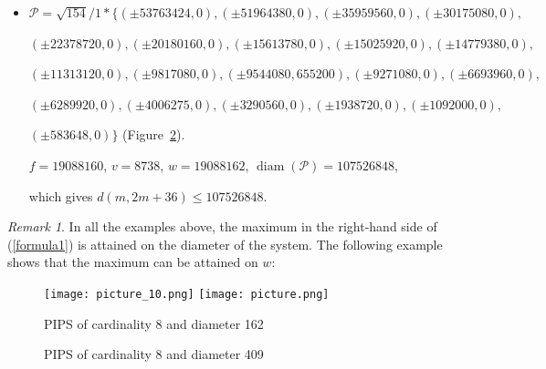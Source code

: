 \documentclass[12pt]{article}
\theoremstyle{theorem}
\theoremstyle{dfn}
\theoremstyle{remark}
\newtheorem{remark}{Remark}
\begin{document}
\begin{itemize}
$
(\pm 4006275, 0),
(\pm 3290560, 0),
(\pm 1938720, 0),
(\pm 1092000, 0),
$

$
(\pm 583648, 0),
(-53763424 , 0)\}
$
(Figure~\ref{picture_39.png}).

$f = 19088160$, $v = 8738$, $w = 19088162$, $\operatorname{diam(\mathcal{P})} = 105727804$,

which gives $d(m, 2m + 35) \leq 105727804$.


\begin{figure}[h!]
\parbox{1\linewidth}{\caption{PIPS of cardinality 39 and diameter 105727804}
\label{picture_39.png}}
\end{figure}


\begin{figure}[h!]
	\begin{center}
	\texttt{[image: picture\_40.png]}
	\parbox{1\linewidth}{\caption{PIPS of cardinality 40 and diameter 107526848}
	\label{picture_40.png}}
	\end{center}
\end{figure}


\item
$\mathcal{P}=\sqrt{154}/{1} * \{ (\pm 53763424, 0),
(\pm 51964380 , 0),
(\pm 35959560 , 0),
(\pm 30175080 , 0),
$

$
(\pm 22378720 , 0),
(\pm 20180160 , 0),
(\pm 15613780 , 0),
(\pm 15025920 , 0),
(\pm 14779380 , 0),
$

$
(\pm 11313120 , 0),
(\pm 9817080 , 0),
(\pm 9544080 , 655200),
(\pm 9271080 , 0),
(\pm 6693960 , 0),
$

$
(\pm 6289920 , 0),
(\pm 4006275 , 0),
(\pm 3290560 , 0),
(\pm 1938720 , 0),
(\pm 1092000 , 0),
$

$
(\pm 583648 , 0)\}
$
(Figure~\ref{picture_40.png}).

$f = 19088160$, $v = 8738$, $w = 19088162$, $\operatorname{diam}(\mathcal{P})
= 107526848$,

which gives $d(m, 2m + 36) \leq 107526848$.

\end{itemize}

\begin{remark}
In all the examples above, the maximum in the right-hand side of (\ref{formula1})
is attained on the diameter of the system.
The following example shows that the maximum can be attained on $w$:
\end{remark}


\begin{figure}[h!]
	\texttt{[image: picture\_10.png]}
	\hfill
	\texttt{[image: picture.png]}
	\\
	\parbox{.48\linewidth}{\caption{PIPS of cardinality 8 and diameter 162}
	\label{picture_10.png}}
	\hfill
	\parbox{.48\linewidth}{\caption{PIPS of cardinality 8 and diameter 409}
	\label{picture.png}}
\end{figure}
\end{document}
